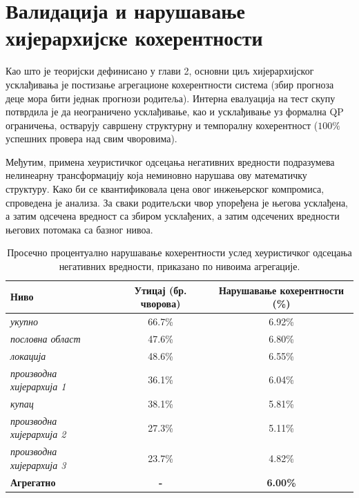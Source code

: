 \documentclass[12pt,oneside]{memoir}
\begin{document}
\section{Валидација и нарушавање хијерархијске кохерентности}

Као што је теоријски дефинисано у глави 2, основни циљ хијерархијског усклађивања је постизање агрегационе кохерентности система (збир прогноза деце мора бити једнак прогнози родитеља). Интерна евалуација на тест скупу потврдила је да неограничено усклађивање, као и усклађивање уз формална QP ограничења, остварују савршену структурну и темпоралну кохерентност ($100\%$ успешних провера над свим чворовима).

Међутим, примена хеуристичког одсецања негативних вредности подразумева нелинеарну трансформацију која неминовно нарушава ову математичку структуру. Како би се квантификовала цена овог инжењерског компромиса, спроведена је анализа. За сваки родитељски чвор упоређена је његова усклађена, а затим одсечена вредност са збиром усклађених, а затим одсечених вредности његових потомака са базног нивоа.

\begin{table}[htbp]
    \centering
    \caption{Просечно процентуално нарушавање кохерентности услед хеуристичког одсецања негативних вредности, приказано по нивоима агрегације.}
    \label{tab:coherence_loss}
    \vspace{0.5em}
    \begin{tabular}{l c c}
        \toprule
        \textbf{Ниво} & \textbf{Утицај (бр. чворова)} & \textbf{Нарушавање кохерентности (\%)} \\
        \midrule
        \textit{укупно} & 66.7\% & 6.92\% \\
        \textit{пословна област} & 47.6\% & 6.80\% \\
        \textit{локација} & 48.6\% & 6.55\% \\
        \textit{производна хијерархија 1} & 36.1\% & 6.04\% \\
        \textit{купац} & 38.1\% & 5.81\% \\
        \textit{производна хијерархија 2} & 27.3\% & 5.11\% \\
        \textit{производна хијерархија 3} & 23.7\% & 4.82\% \\
        \midrule
        \textbf{Агрегатно} & \textbf{-} & \textbf{6.00\%} \\
        \bottomrule
    \end{tabular}
\end{table}
\end{document}
